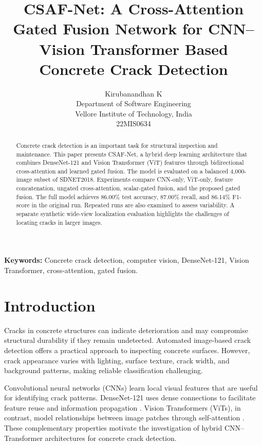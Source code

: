 \documentclass[12pt,a4paper,oneside]{article}
\begin{document}
\onehalfspacing

\title{CSAF-Net: A Cross-Attention Gated Fusion Network for CNN--Vision Transformer Based Concrete Crack Detection}

\author{
Kirubanandhan K\\
\small Department of Software Engineering\\
\small Vellore Institute of Technology, India\\
\small 22MIS0634
}

\maketitle

\begin{abstract}
Concrete crack detection is an important task for structural inspection
and maintenance. This paper presents CSAF-Net, a hybrid deep learning
architecture that combines DenseNet-121 and Vision Transformer (ViT)
features through bidirectional cross-attention and learned gated fusion.
The model is evaluated on a balanced 4,000-image subset of SDNET2018.
Experiments compare CNN-only, ViT-only, feature concatenation, ungated
cross-attention, scalar-gated fusion, and the proposed gated fusion.
The full model achieves 86.00\% test accuracy, 87.00\% recall, and
86.14\% F1-score in the original run. Repeated runs are also examined
to assess variability. A separate synthetic wide-view localization
evaluation highlights the challenges of locating cracks in larger images.
\end{abstract}

\noindent\textbf{Keywords:}
Concrete crack detection, computer vision, DenseNet-121,
Vision Transformer, cross-attention, gated fusion.

\section{Introduction}

Cracks in concrete structures can indicate deterioration and may compromise structural durability if they remain undetected. Automated image-based crack detection offers a practical approach to inspecting concrete surfaces. However, crack appearance varies with lighting, surface texture, crack width, and background patterns, making reliable classification challenging.

Convolutional neural networks (CNNs) learn local visual features that are useful for identifying crack patterns. DenseNet-121 uses dense connections to facilitate feature reuse and information propagation \cite{densenet2017}. Vision Transformers (ViTs), in contrast, model relationships between image patches through self-attention \cite{vit2021,vaswani2017}. These complementary properties motivate the investigation of hybrid CNN–Transformer architectures for concrete crack detection.
\end{document}
